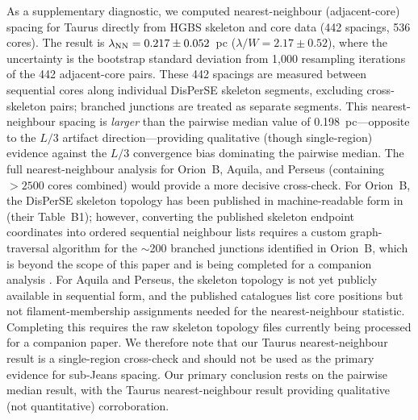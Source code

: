 \documentclass[twoside,twocolumn]{mnras}
\begin{document}
As a supplementary diagnostic, we computed nearest-neighbour (adjacent-core) spacing
for Taurus directly from HGBS skeleton and core data (442 spacings, 536 cores).
The result is $\lambda_{\rm NN} = 0.217 \pm 0.052$~pc ($\lambda/W = 2.17 \pm 0.52$),
where the uncertainty is the bootstrap standard deviation from 1,000 resampling
iterations of the 442 adjacent-core pairs. These 442 spacings are measured between sequential cores along individual DisPerSE skeleton segments, excluding cross-skeleton pairs; branched junctions are treated as separate segments. This nearest-neighbour spacing is
\textit{larger} than the pairwise median value of 0.198~pc---opposite to the
$L/3$ artifact direction---providing qualitative (though single-region) evidence
against the $L/3$ convergence bias dominating the pairwise median.
The full nearest-neighbour analysis for Orion~B, Aquila, and Perseus (containing
$>2500$ cores combined) would provide a more decisive cross-check. For Orion~B, the
DisPerSE skeleton topology has been published in machine-readable form in \citet{Konyves2020}
(their Table~B1); however, converting the published skeleton endpoint coordinates into
ordered sequential neighbour lists requires a custom graph-traversal algorithm for the
$\sim$200 branched junctions identified in Orion~B, which is beyond the scope of this paper
and is being completed for a companion analysis \citep[in prep.;][]{Konyves2020}. For Aquila
and Perseus, the skeleton topology is not yet publicly available in sequential form, and
the published catalogues list core positions but not filament-membership assignments needed
for the nearest-neighbour statistic. Completing this requires the raw skeleton topology files
currently being processed for a companion paper. We therefore note that our Taurus nearest-neighbour result is a
single-region cross-check and should not be used as the primary evidence for sub-Jeans
spacing. Our primary conclusion rests on the pairwise median result, with the Taurus
nearest-neighbour result providing qualitative (not quantitative) corroboration.
\end{document}
